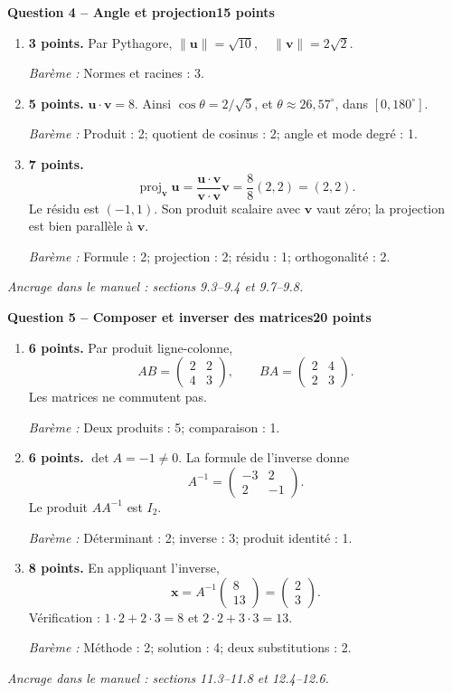 \documentclass[11pt,a4paper]{article}
\begin{document}
\newpage
{\large\bfseries Question 4 -- Angle et projection}\hfill\textbf{15 points}\par
\begin{enumerate}
\item \textbf{3 points.} Par Pythagore, \(\|\mathbf u\|=\sqrt{10},\quad\|\mathbf v\|=2\sqrt2\).
\par{\small\textit{Barème : }Normes et racines : 3.}
\item \textbf{5 points.} \(\mathbf u\cdot\mathbf v=8\). Ainsi \(\cos\theta=2/\sqrt5\), et \(\theta\approx 26{,}57^\circ\), dans \([0,180^\circ]\).
\par{\small\textit{Barème : }Produit : 2; quotient de cosinus : 2; angle et mode degré : 1.}
\item \textbf{7 points.} \[\operatorname{proj}_{\mathbf v}\mathbf u=\frac{\mathbf u\cdot\mathbf v}{\mathbf v\cdot\mathbf v}\mathbf v=\frac88(2,2)=(2,2).\] Le résidu est \((-1,1)\). Son produit scalaire avec \(\mathbf v\) vaut zéro; la projection est bien parallèle à \(\mathbf v\).
\par{\small\textit{Barème : }Formule : 2; projection : 2; résidu : 1; orthogonalité : 2.}
\end{enumerate}
\vfill {\small\textit{Ancrage dans le manuel : sections 9.3--9.4 et 9.7--9.8.}}

\newpage
{\large\bfseries Question 5 -- Composer et inverser des matrices}\hfill\textbf{20 points}\par
\begin{enumerate}
\item \textbf{6 points.} Par produit ligne-colonne, \[AB=\begin{pmatrix}2 & 2\\4 & 3\end{pmatrix},\qquad BA=\begin{pmatrix}2 & 4\\2 & 3\end{pmatrix}.\] Les matrices ne commutent pas.
\par{\small\textit{Barème : }Deux produits : 5; comparaison : 1.}
\item \textbf{6 points.} \(\det A=-1\ne0\). La formule de l’inverse donne \[A^{-1}=\begin{pmatrix}-3 & 2\\2 & -1\end{pmatrix}.\] Le produit \(AA^{-1}\) est \(I_2\).
\par{\small\textit{Barème : }Déterminant : 2; inverse : 3; produit identité : 1.}
\item \textbf{8 points.} En appliquant l’inverse, \[\mathbf x=A^{-1}\begin{pmatrix}8\\13\end{pmatrix}=\begin{pmatrix}2\\3\end{pmatrix}.\] Vérification : \(1\cdot2+2\cdot3=8\) et \(2\cdot2+3\cdot3=13\).
\par{\small\textit{Barème : }Méthode : 2; solution : 4; deux substitutions : 2.}
\end{enumerate}
\vfill {\small\textit{Ancrage dans le manuel : sections 11.3--11.8 et 12.4--12.6.}}
\end{document}
